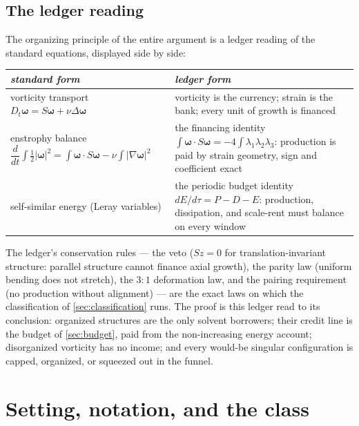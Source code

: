 \documentclass[11pt,letterpaper]{amsart}
\theoremstyle{definition}
\theoremstyle{remark}
\newcommand{\vort}{\boldsymbol{\omega}}
\newcommand{\abs}[1]{\lvert #1 \rvert}
\begin{document}
\subsection{The ledger reading}\label{subsec:ledger}
The organizing principle of the entire argument is a ledger reading of the standard
equations, displayed side by side:

\begin{center}\small
\begin{tabular}{@{}p{}p{}@{}}
\toprule
\emph{standard form} & \emph{ledger form} \\
\midrule
vorticity transport\; $D_t\vort=S\vort+\nu\Delta\vort$ &
vorticity is the currency; strain is the bank; every unit of growth is financed \\
\addlinespace[3pt]
enstrophy balance\; $\dfrac{d}{dt}\displaystyle\int\tfrac12\abs{\vort}^2
=\int\vort\cdot S\vort-\nu\!\int\abs{\nabla\vort}^2$ &
the financing identity\;
$\displaystyle\int\vort\cdot S\vort=-4\!\int\lambda_1\lambda_2\lambda_3$:
production is paid by strain geometry, sign and coefficient exact \\
\addlinespace[3pt]
self-similar energy (Leray variables) &
the periodic budget identity\; $dE/d\tau=P-D-E$: production, dissipation, and
scale-rent must balance on every window \\
\bottomrule
\end{tabular}
\end{center}

\smallskip
The ledger's conservation rules --- the veto ($S\hat z=0$ for translation-invariant
structure: parallel structure cannot finance axial growth), the parity law (uniform
bending does not stretch), the $3{:}1$ deformation law, and the pairing requirement
(no production without alignment) --- are the exact laws on which the classification
of \cref{sec:classification} runs. The proof is this ledger read to its conclusion:
organized structures are the only solvent borrowers; their credit line is the budget of
\cref{sec:budget}, paid from the non-increasing energy account; disorganized vorticity
has no income; and every would-be singular configuration is capped, organized, or
squeezed out in the funnel.

\section{Setting, notation, and the class}\label{sec:setup}
\end{document}
